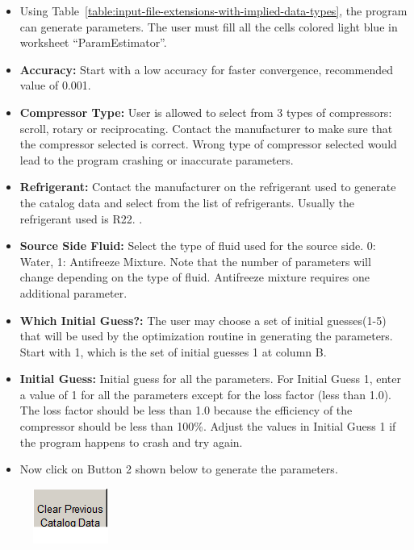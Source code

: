 \begin{itemize}
\item
  Using Table~\ref{table:input-file-extensions-with-implied-data-types}, the program can generate parameters. The user must fill all the cells colored light blue in worksheet ``ParamEstimator''.
\item
  \textbf{Accuracy:} Start with a low accuracy for faster convergence, recommended value of 0.001.
\item
  \textbf{Compressor Type:} User is allowed to select from 3 types of compressors: scroll, rotary or reciprocating. Contact the manufacturer to make sure that the compressor selected is correct. Wrong type of compressor selected would lead to the program crashing or inaccurate parameters.
\item
  \textbf{Refrigerant:} Contact the manufacturer on the refrigerant used to generate the catalog data and select from the list of refrigerants. Usually the refrigerant used is R22. .
\item
  \textbf{Source Side Fluid:} Select the type of fluid used for the source side. 0: Water, 1: Antifreeze Mixture. Note that the number of parameters will change depending on the type of fluid. Antifreeze mixture requires one additional parameter.
\item
  \textbf{Which Initial Guess?:} The user may choose a set of initial guesses(1-5) that will be used by the optimization routine in generating the parameters. Start with 1, which is the set of initial guesses 1 at column B.
\item
  \textbf{Initial Guess:} Initial guess for all the parameters. For Initial Guess 1, enter a value of 1 for all the parameters except for the loss factor (less than 1.0). The loss factor should be less than 1.0 because the efficiency of the compressor should be less than 100\%. Adjust the values in Initial Guess 1 if the program happens to crash and try again.
\item
  Now click on Button 2 shown below to generate the parameters.
\end{itemize}

\begin{figure}[htbp]
\centering
\includegraphics{media/image057.png}
\caption{}
\end{figure}

